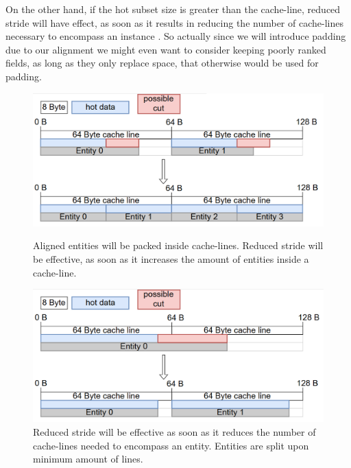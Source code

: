 On the other hand, if the hot subset size is greater than the cache-line, reduced stride will have effect, as soon as it results in reducing the number of cache-lines necessary to encompass an instance . So actually since we will introduce padding due to our alignment we might even want to consider keeping poorly ranked fields, as long as they only replace space, that otherwise would be used for padding.
\begin{figure}[ht]
	\begin{minipage}[b]{0.5\linewidth}
		\centering
		\includegraphics[width=\textwidth,height=.6\textwidth]{PICs/opt_possibility_1}
		\caption{Aligned entities will be packed inside cache-lines. Reduced stride will be effective, as soon as it increases the amount of entities inside a cache-line.}
		\label{opt_p_1}
	\end{minipage}
	\hspace{0.5cm}
	\begin{minipage}[b]{0.5\linewidth}
		\centering
		\includegraphics[width=\textwidth,height=.6\textwidth]{PICs/opt_possibility_2}
		\caption{Reduced stride will be effective as soon as it reduces the number of cache-lines needed to encompass an entity. Entities are split upon minimum amount of lines.}
		\label{opt_p_2}
	\end{minipage}
\end{figure}
